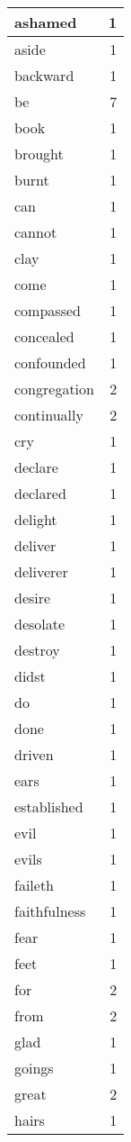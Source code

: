 \begin{center}
\begin{longtable}{l|r}
ashamed & 1 \\ \hline
aside & 1 \\ \hline
backward & 1 \\ \hline
be & 7 \\ \hline
book & 1 \\ \hline
brought & 1 \\ \hline
burnt & 1 \\ \hline
can & 1 \\ \hline
cannot & 1 \\ \hline
clay & 1 \\ \hline
come & 1 \\ \hline
compassed & 1 \\ \hline
concealed & 1 \\ \hline
confounded & 1 \\ \hline
congregation & 2 \\ \hline
continually & 2 \\ \hline
cry & 1 \\ \hline
declare & 1 \\ \hline
declared & 1 \\ \hline
delight & 1 \\ \hline
deliver & 1 \\ \hline
deliverer & 1 \\ \hline
desire & 1 \\ \hline
desolate & 1 \\ \hline
destroy & 1 \\ \hline
didst & 1 \\ \hline
do & 1 \\ \hline
done & 1 \\ \hline
driven & 1 \\ \hline
ears & 1 \\ \hline
established & 1 \\ \hline
evil & 1 \\ \hline
evils & 1 \\ \hline
faileth & 1 \\ \hline
faithfulness & 1 \\ \hline
fear & 1 \\ \hline
feet & 1 \\ \hline
for & 2 \\ \hline
from & 2 \\ \hline
glad & 1 \\ \hline
goings & 1 \\ \hline
great & 2 \\ \hline
hairs & 1 \\ \hline

\end{longtable}
\end{center}
